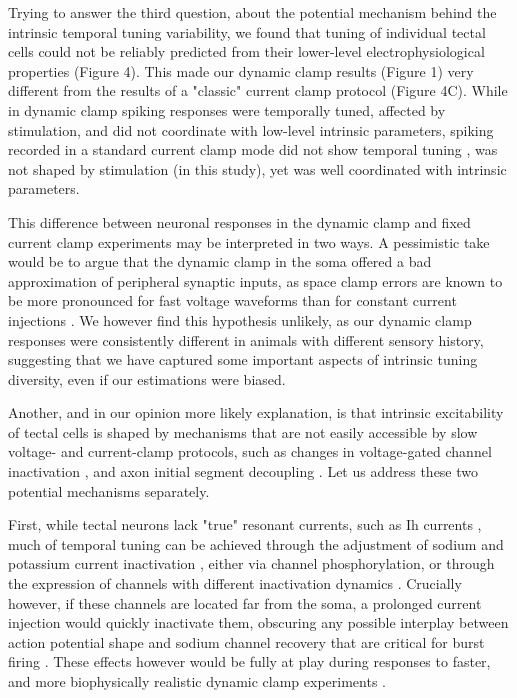 \documentclass{article}
\begin{document}
Trying to answer the third question, about the potential mechanism behind the intrinsic temporal tuning variability, we found that tuning of individual tectal cells could not be reliably predicted from their lower-level electrophysiological properties (Figure 4). This made our dynamic clamp results (Figure 1) very different from the results of a "classic" current clamp protocol (Figure 4C). While in dynamic clamp spiking responses were temporally tuned, affected by stimulation, and did not coordinate with low-level intrinsic parameters, spiking recorded in a standard current clamp mode did not show temporal tuning \citep{ciarleglio2015}, was not shaped by stimulation (in this study), yet was well coordinated with intrinsic parameters. 

This difference between neuronal responses in the dynamic clamp and fixed current clamp experiments may be interpreted in two ways. A pessimistic take would be to argue that the dynamic clamp in the soma offered a bad approximation of peripheral synaptic inputs, as space clamp errors are known to be more pronounced for fast voltage waveforms than for constant current injections \citep{spruston1993, prinz2004}. We however find this hypothesis unlikely, as our dynamic clamp responses were consistently different in animals with different sensory history, suggesting that we have captured some important aspects of intrinsic tuning diversity, even if our estimations were biased. 

Another, and in our opinion more likely explanation, is that intrinsic excitability of tectal cells is shaped by mechanisms that are not easily accessible by slow voltage- and current-clamp protocols, such as changes in voltage-gated channel inactivation \citep{azouz2000threshold}, and axon initial segment decoupling \citep{grubb2010activity, kuba2010initial, kole2012}. Let us address these two potential mechanisms separately.

First, while tectal neurons lack "true" resonant currents, such as Ih currents \citep{ciarleglio2015}, much of temporal tuning can be achieved through the adjustment of sodium and potassium current inactivation \citep{azouz2000threshold, fontaine2014threshold}, either via channel phosphorylation, or through the expression of channels with different inactivation dynamics \citep{frank2003nachannels, goldwyn2018a_current}. Crucially however, if these channels are located far from the soma, a prolonged current injection would quickly inactivate them, obscuring any possible interplay between action potential shape and sodium channel recovery that are critical for burst firing \citep{popovic2011, kole2012, fontaine2014threshold}. These effects however would be fully at play during responses to faster, and more biophysically realistic dynamic clamp experiments \citep{clay2012optimal, zbili2019axonnav}.
\end{document}
